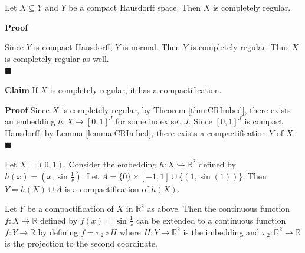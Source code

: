 \documentclass[main.tex]{subfiles}
\begin{document}
\begin{property}
    Let $X \subseteq Y$ and $Y$ be a compact Hausdorff space. Then $X$ is completely regular. 
\end{property}
\par \noindent \textbf{Proof} 
\par Since $Y$ is compact Hausdorff, $Y$ is normal. Then $Y$ is completely regular. Thus $X$ is completely regular as well. \mbox{} \\ \null \hfill $\blacksquare$

\par \noindent \textbf{Claim}
    If $X$ is completely regular, it has a compactification.
\par \noindent \textbf{Proof} Since $X$ is completely regular, by Theorem \ref{thm:CRImbed}, there exists an embedding $h: X \to [0, 1]^J$ for some index set $J$. Since $[0, 1]^J$ is compact Hausdorff, by Lemma \ref{lemma:CRImbed}, there exists a compactification $Y$ of $X$. 
\mbox{} \\ \null \hfill $\blacksquare$ 

\begin{example}
    Let $X = (0, 1)$. Consider the embedding $h: X \hookrightarrow \mathbb{R}^2$ defined by $h(x) = (x, \sin \frac{1}{x})$. Let $A = \{0\} \times [-1, 1] \cup \{(1, \sin(1))\}$. Then $Y = h(X) \cup A$ is a compactification of $h(X)$.
\end{example}

\par Let $Y$ be a compactification of $X$ in $\mathbb{R}^2$ as above. Then the continuous function $f: X \to \mathbb{R}$ defined by $f(x) = \sin \frac{1}{x}$ can be extended to a continuous function $\overline{f}: Y \to \mathbb{R}$ by defining $\overline{f} = \pi_2\circ H$ where $H: Y \to \mathbb{R}^2$ is the imbedding and $\pi_2: \mathbb{R}^2 \to \mathbb{R}$ is the projection to the second coordinate. 
\end{document}
